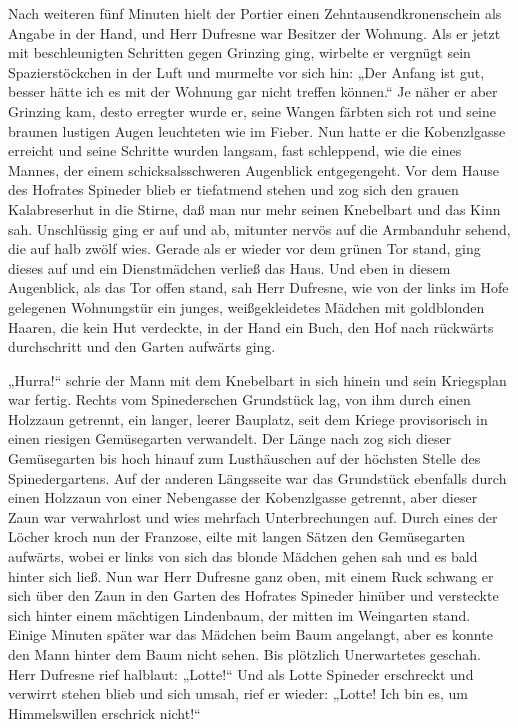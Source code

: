 Nach weiteren fünf Minuten hielt der Portier einen
Zehntausendkronenschein als Angabe in der Hand, und Herr Dufresne
war Besitzer der Wohnung. Als er jetzt mit beschleunigten Schritten
gegen Grinzing ging, wirbelte er vergnügt sein Spazierstöckchen in
der Luft und murmelte vor sich hin: „Der Anfang ist gut, besser
hätte ich es mit der Wohnung gar nicht treffen können.“ Je näher er
aber Grinzing kam, desto erregter wurde er, seine Wangen färbten
sich rot und seine braunen lustigen Augen leuchteten wie im Fieber.
Nun hatte er die Kobenzlgasse erreicht und seine Schritte wurden
langsam, fast schleppend, wie die eines Mannes, der einem
schicksalsschweren Augenblick entgegengeht. Vor dem Hause des
Hofrates Spineder blieb  er tiefatmend stehen und
zog sich den grauen Kalabreserhut in die Stirne, daß man nur mehr
seinen Knebelbart und das Kinn sah. Unschlüssig ging er auf und ab,
mitunter nervös auf die Armbanduhr sehend, die auf halb zwölf wies.
Gerade als er wieder vor dem grünen Tor stand, ging dieses auf und
ein Dienstmädchen verließ das Haus. Und eben in diesem Augenblick,
als das Tor offen stand, sah Herr Dufresne, wie von der links im
Hofe gelegenen Wohnungstür ein junges, weißgekleidetes Mädchen mit
goldblonden Haaren, die kein Hut verdeckte, in der Hand ein Buch,
den Hof nach rückwärts durchschritt und den Garten aufwärts ging.

„Hurra!“ schrie der Mann mit dem Knebelbart in sich hinein und sein
Kriegsplan war fertig. Rechts vom Spinederschen Grundstück lag, von
ihm durch einen Holzzaun getrennt, ein langer, leerer Bauplatz,
seit dem Kriege provisorisch in einen riesigen Gemüsegarten
verwandelt. Der Länge nach zog sich dieser Gemüsegarten bis hoch
hinauf zum Lusthäuschen auf der höchsten Stelle des
Spinedergartens. Auf der anderen Längsseite war das Grundstück
ebenfalls durch einen Holzzaun von einer Nebengasse der
Kobenzlgasse getrennt, aber dieser Zaun war verwahrlost und wies
mehrfach Unterbrechungen auf. Durch eines der Löcher kroch nun der
Franzose, eilte mit langen Sätzen den Gemüsegarten aufwärts, wobei
er links von sich das blonde Mädchen gehen sah und es bald hinter
sich ließ. Nun war Herr Dufresne ganz oben, mit einem Ruck schwang
er sich über den Zaun in den Garten des Hofrates Spineder hinüber
und versteckte sich hinter einem mächtigen Lindenbaum,
 der mitten im Weingarten stand. Einige Minuten
später war das Mädchen beim Baum angelangt, aber es konnte den Mann
hinter dem Baum nicht sehen. Bis plötzlich Unerwartetes geschah.
Herr Dufresne rief halblaut: „Lotte!“ Und als Lotte Spineder
erschreckt und verwirrt stehen blieb und sich umsah, rief er
wieder: „Lotte! Ich bin es, um Himmelswillen erschrick nicht!“

